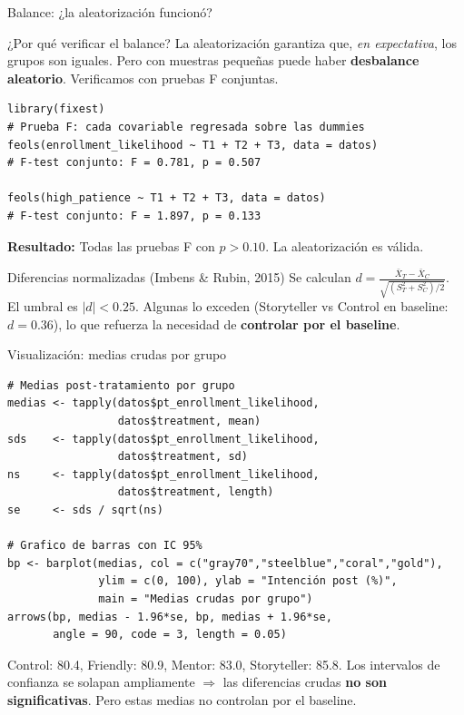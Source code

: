 \documentclass[aspectratio=169, 11pt]{beamer}
\begin{document}
\begin{frame}[fragile]{Balance: ¿la aleatorización funcionó?}
\begin{exampleblock}{¿Por qué verificar el balance?}
\small
La aleatorización garantiza que, \textit{en expectativa}, los grupos son iguales. Pero con muestras pequeñas puede haber \textbf{desbalance aleatorio}. Verificamos con pruebas F conjuntas.
\end{exampleblock}

\begin{lstlisting}[basicstyle=\ttfamily\scriptsize]
library(fixest)
# Prueba F: cada covariable regresada sobre las dummies
feols(enrollment_likelihood ~ T1 + T2 + T3, data = datos)
# F-test conjunto: F = 0.781, p = 0.507

feols(high_patience ~ T1 + T2 + T3, data = datos)
# F-test conjunto: F = 1.897, p = 0.133
\end{lstlisting}

\vspace{0.1cm}
\textbf{Resultado:} Todas las pruebas F con $p > 0.10$. La aleatorización es válida.

\vspace{0.1cm}
\begin{alertblock}{Diferencias normalizadas (Imbens \& Rubin, 2015)}
\small
Se calculan $d = \frac{\bar{X}_T - \bar{X}_C}{\sqrt{(S_T^2 + S_C^2)/2}}$. El umbral es $|d| < 0.25$. Algunas lo exceden (Storyteller vs Control en baseline: $d = 0.36$), lo que refuerza la necesidad de \textbf{controlar por el baseline}.
\end{alertblock}
\end{frame}

\begin{frame}[fragile]{Visualización: medias crudas por grupo}
\begin{lstlisting}[basicstyle=\ttfamily\scriptsize]
# Medias post-tratamiento por grupo
medias <- tapply(datos$pt_enrollment_likelihood,
                 datos$treatment, mean)
sds    <- tapply(datos$pt_enrollment_likelihood,
                 datos$treatment, sd)
ns     <- tapply(datos$pt_enrollment_likelihood,
                 datos$treatment, length)
se     <- sds / sqrt(ns)

# Grafico de barras con IC 95%
bp <- barplot(medias, col = c("gray70","steelblue","coral","gold"),
              ylim = c(0, 100), ylab = "Intención post (%)",
              main = "Medias crudas por grupo")
arrows(bp, medias - 1.96*se, bp, medias + 1.96*se,
       angle = 90, code = 3, length = 0.05)
\end{lstlisting}

\vspace{0.1cm}
{\small Control: 80.4, Friendly: 80.9, Mentor: 83.0, Storyteller: 85.8. Los intervalos de confianza se solapan ampliamente $\Rightarrow$ las diferencias crudas \textbf{no son significativas}. Pero estas medias no controlan por el baseline.}
\end{frame}
\end{document}
